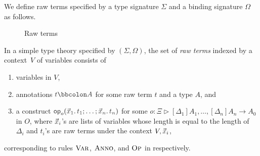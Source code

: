 We define raw terms specified by a type signature $\Sigma$ and a binding signature $\Omega$ as follows.
\begin{definition}
\begin{figure}
  \centering
  \small
  \caption{Raw terms}
  \label{fig:raw-terms}
\end{figure}
  In a simple type theory specified by $(\Sigma, \Omega)$, the set of \emph{raw terms} indexed by a context~$V$ of variables consists of
  \begin{enumerate}
    \item variables in $V$,
    \item annotations $\isTerm{t \annotate A}$ for some raw term $t$ and a type $A$, and
    \item a construct $\tmOpts$ for some $o \colon \Xi \rhd [\Delta_1]A_{1}, \ldots, [\Delta_{n}] A_{n} \to A_0$ in $O$, where $\vars{x}_{\isTerm{i}}$'s are lists of variables whose length is equal to the length of~$\Delta_i$ and $t_i$'s are raw terms under the context $V, \vars{x}_i$,
  \end{enumerate}
  corresponding to rules $\textnormal{\textsc{Var}}$, $\textnormal{\textsc{Anno}}$, and $\textnormal{\textsc{Op}}$ in  respectively.
\end{definition}


